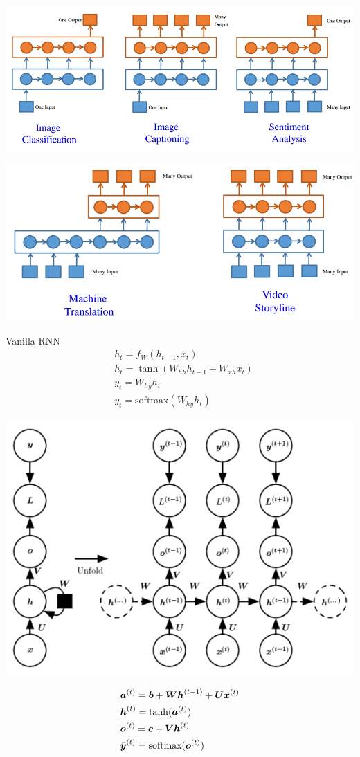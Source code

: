 \documentclass[11pt]{article}
\begin{document}
\begin{center}
\includegraphics[width=.9\textwidth]{Seq2seq1}
\end{center}
\begin{center}
\includegraphics[width=.9\textwidth]{Seq2seq2}
\end{center}


Vanilla RNN
\begin{align*}
&h_t=f_W(h_{t-1},x_t)\\
&h_t=\tanh(W_{hh}h_{t-1}+W_{xh}x_t)\\
&y_t=W_{hy}h_t\\
&y_t=\text{softmax}(W_{hy}h_t)
\end{align*}


\begin{center}
\includegraphics[width=.9\textwidth]{RNNGraph}
\end{center}
\begin{align*}
&\boldsymbol{a}^{(t)}=\boldsymbol{b}+\boldsymbol{W}\boldsymbol{h}^{(t-1)}+\boldsymbol{U}\boldsymbol{x}^{(t)}\\
&\boldsymbol{h}^{(t)}=\tanh(\boldsymbol{a}^{(t)})\\
&\boldsymbol{o}^{(t)}=\boldsymbol{c}+\boldsymbol{V}\boldsymbol{h}^{(t)}\\
&\hat{\boldsymbol{y}}^{(t)}=\text{softmax}(\boldsymbol{o}^{(t)})
\end{align*}
\end{document}
